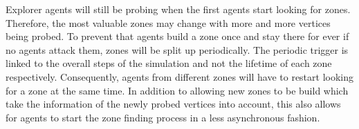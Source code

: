 Explorer agents will still be probing when the first agents start looking for zones.
Therefore, the most valuable zones may change with more and more vertices being probed.
To prevent that agents build a zone once and stay there for ever if no agents attack them, zones will be split up periodically.
The periodic trigger is linked to the overall steps of the simulation and not the lifetime of each zone respectively.
Consequently, agents from different zones will have to restart looking for a zone at the same time.
In addition to allowing new zones to be build which take the information of the newly probed vertices into account, this also allows for agents to start the zone finding process in a less asynchronous fashion.
